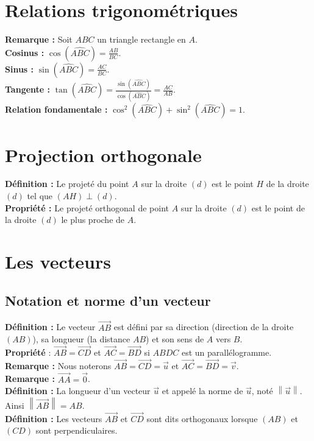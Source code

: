 \documentclass[a4paper,titlepage]{article}
\let\oldsection\section
\renewcommand\section{\clearpage\oldsection}
\begin{document}
\section{Relations trigonométriques}
    \textbf{Remarque :} Soit $ABC$ un triangle rectangle en $A$.
    \\
    \textbf{Cosinus :} $\cos\left(\widehat{ABC}\right)=\frac{AB}{BC}$.
    \\
    \textbf{Sinus :} $\sin\left(\widehat{ABC}\right)=\frac{AC}{BC}$.
    \\
    \textbf{Tangente :} $\tan\left(\widehat{ABC}\right)=\frac{\sin\left(\widehat{ABC}\right)}{\cos\left(\widehat{ABC}\right)}=\frac{AC}{AB}$.
    \\
    \textbf{Relation fondamentale :} $\cos^{2}\left(\widehat{ABC}\right)+\sin^{2}\left(\widehat{ABC}\right)=1$.
\section{Projection orthogonale}
    \textbf{Définition :} Le projeté du point $A$ sur la droite $\left(d\right)$ est le point $H$ de la droite $\left(d\right)$ tel que $\left(AH\right)\perp\left(d\right)$.
    \\
    \textbf{Propriété :} Le projeté orthogonal de point $A$ sur la droite $\left(d\right)$ est le point de la droite $\left(d\right)$ le plus proche de $A$.
\section{Les vecteurs}
    \subsection{Notation et norme d’un vecteur}
        \textbf{Définition :} Le vecteur $\overrightarrow{AB}$ est défini par sa direction (direction de la droite $\left(AB\right)$), sa longueur (la distance $AB$) et son sens de $A$ vers $B$.
        \\
        \textbf{Propriété} : $\overrightarrow{AB}=\overrightarrow{CD}$ et $\overrightarrow{AC}=\overrightarrow{BD}$ si $ABDC$ est un parallélogramme.
        \\
        \textbf{Remarque :} Nous noterons $\overrightarrow{AB}=\overrightarrow{CD}=\vec{u}$ et $\overrightarrow{AC}=\overrightarrow{BD}=\vec{v}$.
        \\
        \textbf{Remarque :} $\overrightarrow{AA}=\overrightarrow{0}$.
        \\
        \textbf{Définition :} La longueur d’un vecteur $\vec{u}$ et appelé la norme de $\vec{u}$, noté $\left\|\vec{u}\right\|$. Ainsi $\left\|\overrightarrow{AB}\right\|=AB$.
        \\
        \textbf{Définition :} Les vecteurs $\overrightarrow{AB}$ et $\overrightarrow{CD}$ sont dits orthogonaux lorsque $\left(AB\right)$ et $\left(CD\right)$ sont perpendiculaires.
\end{document}
